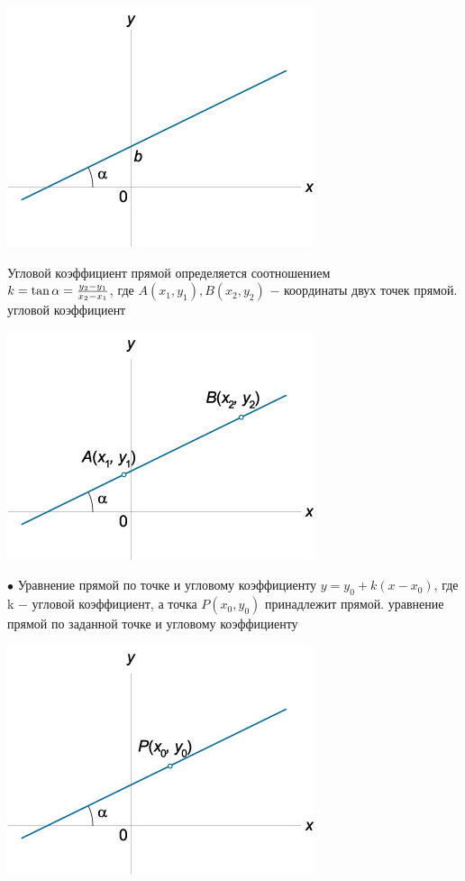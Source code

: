 \documentclass[oneside]{book}
\begin{document}
\begin{enumerate}
\begin{itemize}
\begin{enumerate}
\begin{center}
\includegraphics[scale=0.4]{./pics/3.jpg}
\end{center}

Угловой коэффициент прямой определяется соотношением \\
$k = \tan \alpha = \large\frac{{{y_2} - {y_1}}}{{{x_2} - {x_1}}}\normalsize$,
где $A\left( {{x_1},{y_1}} \right), B\left( {{x_2},{y_2}} \right)$ − координаты двух точек прямой.
угловой коэффициент

\begin{center}
\includegraphics[scale=0.4]{./pics/4.jpg}
\end{center}

$\bullet$  Уравнение прямой по точке и угловому коэффициенту
$y = {y_0} + k\left( {x - {x_0}} \right)$,
где k − угловой коэффициент, а точка $P\left( {{x_0},{y_0}} \right)$ принадлежит прямой.
уравнение прямой по заданной точке и угловому коэффициенту

\begin{center}
\includegraphics[scale=0.4]{./pics/5.jpg}
\end{center}


\end{enumerate}
\end{itemize}
\end{enumerate}
\end{document}
